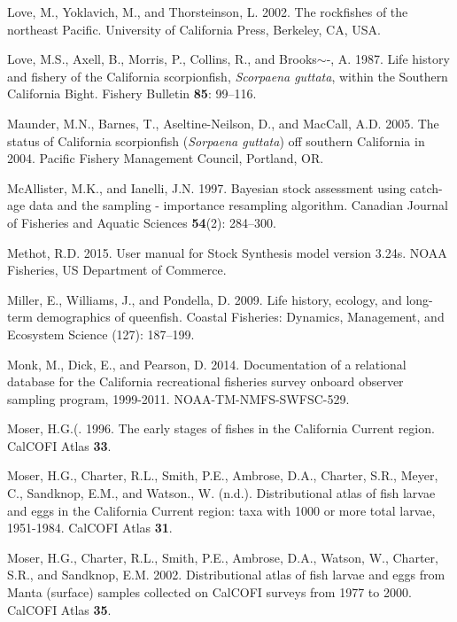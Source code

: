 \documentclass[12pt,]{article}
\begin{document}
\hypertarget{ref-Love2002}{}
Love, M., Yoklavich, M., and Thorsteinson, L. 2002. The rockfishes of
the northeast Pacific. University of California Press, Berkeley, CA,
USA.

\hypertarget{ref-Love1987}{}
Love, M.S., Axell, B., Morris, P., Collins, R., and Brooks\(\sim\)-, A.
1987. Life history and fishery of the California scorpionfish,
\emph{Scorpaena guttata}, within the Southern California Bight. Fishery
Bulletin \textbf{85}: 99--116.

\hypertarget{ref-Maunder2005}{}
Maunder, M.N., Barnes, T., Aseltine-Neilson, D., and MacCall, A.D. 2005.
The status of California scorpionfish (\emph{Sorpaena guttata}) off
southern California in 2004. Pacific Fishery Management Council,
Portland, OR.

\hypertarget{ref-McAllister1997}{}
McAllister, M.K., and Ianelli, J.N. 1997. Bayesian stock assessment
using catch-age data and the sampling - importance resampling algorithm.
Canadian Journal of Fisheries and Aquatic Sciences \textbf{54}(2):
284--300.

\hypertarget{ref-Methot2015}{}
Methot, R.D. 2015. User manual for Stock Synthesis model version 3.24s.
NOAA Fisheries, US Department of Commerce.

\hypertarget{ref-Miller2009}{}
Miller, E., Williams, J., and Pondella, D. 2009. Life history, ecology,
and long-term demographics of queenfish. Coastal Fisheries: Dynamics,
Management, and Ecosystem Science (127): 187--199.

\hypertarget{ref-Monk2014}{}
Monk, M., Dick, E., and Pearson, D. 2014. Documentation of a relational
database for the California recreational fisheries survey onboard
observer sampling program, 1999-2011. NOAA-TM-NMFS-SWFSC-529.

\hypertarget{ref-Moser1996}{}
Moser, H.G.(. 1996. The early stages of fishes in the California Current
region. CalCOFI Atlas \textbf{33}.

\hypertarget{ref-Moser1993}{}
Moser, H.G., Charter, R.L., Smith, P.E., Ambrose, D.A., Charter, S.R.,
Meyer, C., Sandknop, E.M., and Watson., W. (n.d.). Distributional atlas
of fish larvae and eggs in the California Current region: taxa with 1000
or more total larvae, 1951-1984. CalCOFI Atlas \textbf{31}.

\hypertarget{ref-Moser2002}{}
Moser, H.G., Charter, R.L., Smith, P.E., Ambrose, D.A., Watson, W.,
Charter, S.R., and Sandknop, E.M. 2002. Distributional atlas of fish
larvae and eggs from Manta (surface) samples collected on CalCOFI
surveys from 1977 to 2000. CalCOFI Atlas \textbf{35}.
\end{document}
